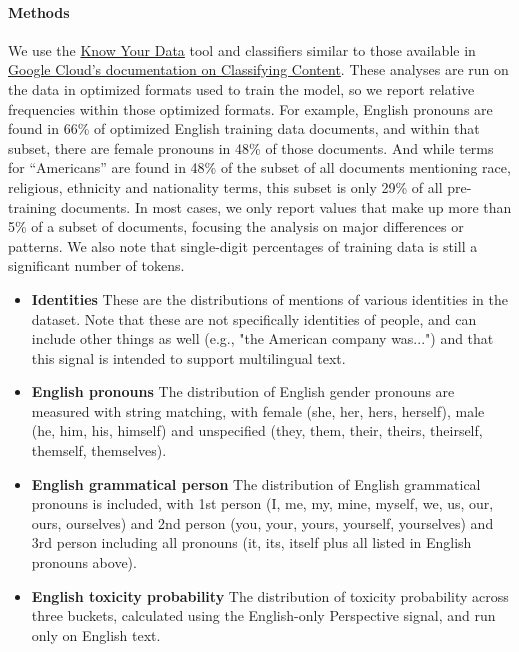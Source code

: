 \paragraph{Methods} We use the \href{https://knowyourdata.withgoogle.com/}{Know Your Data} tool and classifiers similar to those available in \href{https://cloud.google.com/natural-language/docs/classifying-text}{Google Cloud's documentation on Classifying Content}.  These analyses are run on the data in optimized formats used to train the model, so we report relative frequencies within those optimized formats.  For example, English pronouns are found in 66\% of optimized English training data documents, and within that subset, there are female pronouns in 48\% of those documents.  And while terms for ``Americans'' are found in 48\% of the subset of all documents mentioning race, religious, ethnicity and nationality terms, this subset is only 29\% of all pre-training documents.  In most cases, we only report values that make up more than 5\% of a subset of documents, focusing the analysis on major differences or patterns.  We also note that single-digit percentages of training data is still a significant number of tokens.

\begin{itemize}
\item \textbf{Identities}
These are the distributions of mentions of various identities in the dataset. Note that these are not specifically identities of people, and can include other things as well (e.g., "the American company was...") and that this signal is intended to support multilingual text.

\item \textbf{English pronouns}
The distribution of English gender pronouns are measured with string matching, with female (she, her, hers, herself), male (he, him, his, himself) and unspecified (they, them, their, theirs, theirself, themself, themselves).

\item \textbf{English grammatical person}
The distribution of English grammatical pronouns is included, with 1st person (I, me, my, mine, myself, we, us, our, ours, ourselves) and 2nd person (you, your, yours, yourself, yourselves) and 3rd person including all pronouns (it, its, itself plus all listed in English pronouns above).

\item \textbf{English toxicity probability}
The distribution of toxicity probability across three buckets, calculated using the English-only Perspective signal, and run only on English text.
\end{itemize}

